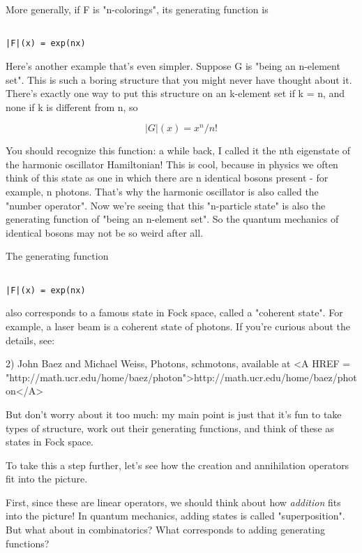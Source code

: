 More generally, if F is "n-colorings", its generating function is


\begin{verbatim}

|F|(x) = exp(nx)
\end{verbatim}
    
Here's another example that's even simpler.  Suppose G is "being an
n-element set".  This is such a boring structure that you might never
have thought about it.  There's exactly one way to put this structure on
an k-element set if k = n, and none if k is different from n, so


$$

|G|(x) =  x^{n} / n!
$$
    
You should recognize this function: a while back, I called it the nth
eigenstate of the harmonic oscillator Hamiltonian!  This is cool,
because in physics we often think of this state as one in which there
are n identical bosons present - for example, n photons.  That's why
the harmonic oscillator is also called the "number operator".   Now
we're seeing that this "n-particle state" is also the generating
function of "being an n-element set".  So the quantum mechanics of
identical bosons may not be so weird after all.

The generating function


\begin{verbatim}

|F|(x) = exp(nx)
\end{verbatim}
    
also corresponds to a famous state in Fock space, called a
"coherent state".  For example, a laser beam is a coherent
state of photons.  If you're curious about the details, see:

2) John Baez and Michael Weiss, Photons, schmotons, available at
<A HREF = "http://math.ucr.edu/home/baez/photon">http://math.ucr.edu/home/baez/photon</A>

But don't worry about it too much: my main point is just that it's fun
to take types of structure, work out their generating functions, and
think of these as states in Fock space.  

To take this a step further, let's see how the creation and annihilation
operators fit into the picture.

First, since these are linear operators, we should think about how
\emph{addition} fits into the picture!  In quantum mechanics, adding states
is called "superposition".  But what about in combinatorics?  What
corresponds to adding generating functions?

